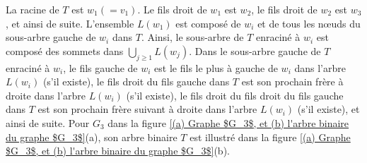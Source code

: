 \documentclass[hidelinks,letterpaper,12pt]{article}
\begin{document}
La racine de $T$ est $w_1 (= v_1)$. Le fils droit de $w_1$ est $w_2$, le fils droit de $w_2$ est $w_3$, et ainsi de suite. L'ensemble $L(w_1)$ est composé de $w_i$ et de tous les nœuds du sous-arbre gauche de $w_i$ dans $T$.
Ainsi, le sous-arbre de $T$ enraciné à $w_i$ est composé des sommets dans $\bigcup_{j\geq1} L(w_j)$. Dans le sous-arbre gauche de $T$ enraciné à $w_i$, le fils gauche de $w_i$ est le fils le plus à gauche de $w_i$ dans l'arbre $L(w_i)$ (s'il existe), le fils droit du fils gauche dans $T$ est son prochain frère à droite dans l'arbre $L(w_i)$ (s'il existe), le fils droit du fils droit du fils gauche dans $T$ est son prochain frère suivant à droite dans l'arbre $L(w_i)$ (s'il existe), et ainsi de suite. Pour $G_3$ dans la figure \ref{(a) Graphe $G_3$, et (b) l'arbre binaire du graphe $G_3$}(a), son arbre binaire $T$ est illustré dans la figure \ref{(a) Graphe $G_3$, et (b) l'arbre binaire du graphe $G_3$}(b).
\end{document}
